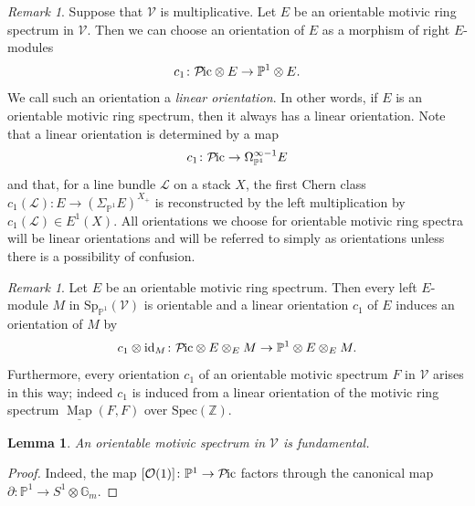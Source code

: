 \documentclass{amsart}
\theoremstyle{plain}
\newtheorem{lemma}[theorem]{Lemma}
\theoremstyle{definition}
\theoremstyle{remark}
\newtheorem{remark}[theorem]{Remark}
\numberwithin{equation}{theorem}
\newcommand{\mcal}[1]{\mathcal{#1}}
\newcommand{\mbb}[1]{\mathbb{#1}}
\newcommand{\Spec}{\mathrm{Spec}}
\newcommand{\V}{\mathcal{V}}
\newcommand{\id}{\mathrm{id}}
\newcommand{\OmegaP}{\Omega_{\mathbb{P}^1}}
\newcommand{\SigmaP}{\Sigma_{\mathbb{P}^1}}
\newcommand{\SpP}{\mathrm{Sp}_{\mathbb{P}^1}}
\newcommand{\Pic}{{\mathcal{P}\mspace{-2.0mu}\mathrm{ic}}}
\newcommand{\Map}{\operatorname{Map}}
\newcommand{\intMap}{\underline{\Map}}
\begin{document}
\begin{remark}
Suppose that $\V$ is multiplicative.
Let $E$ be an orientable motivic ring spectrum in $\V$.
Then we can choose an orientation of $E$ as a morphism of right $E$-modules
\[
	c_1 \colon \Pic\otimes E\to\mbb{P}^1\otimes E.
\]
We call such an orientation a \textit{linear orientation}.
In other words, if $E$ is an orientable motivic ring spectrum, then it always has a linear orientation.
Note that a linear orientation is determined by a map
\[
	c_1 \colon \Pic \to \OmegaP^{\infty-1}E
\]
and that, for a line bundle $\mcal{L}$ on a stack $X$, the first Chern class $c_1(\mcal{L})\colon E\to(\SigmaP E)^{X_+}$ is reconstructed by the left multiplication by $c_1(\mcal{L})\in E^1(X)$.
All orientations we choose for orientable motivic ring spectra will be linear orientations and will be referred to simply as orientations unless there is a possibility of confusion.
\end{remark}

\begin{remark}
Let $E$ be an orientable motivic ring spectrum.
Then every left $E$-module $M$ in $\SpP(\V)$ is orientable and a linear orientation $c_1$ of $E$ induces an orientation of $M$ by
\[
	c_1\otimes\id_M \colon \Pic\otimes E\otimes_EM \to \mbb{P}^1\otimes E\otimes_EM.
\]
Furthermore, every orientation $c_1$ of an orientable motivic spectrum $F$ in $\V$ arises in this way;
indeed $c_1$ is induced from a linear orientation of the motivic ring spectrum $\intMap(F,F)$ over $\Spec(\mbb{Z})$.
\end{remark}

\begin{lemma}\label{lem:Ori2}
An orientable motivic spectrum in $\V$ is fundamental.
\end{lemma}
\begin{proof}
Indeed, the map $[\mcal{O}(1)]\colon\mbb{P}^1\to\Pic$ factors through the canonical map $\partial\colon\mbb{P}^1\to S^1\otimes\mbb{G}_m$.
\end{proof}
\end{document}
